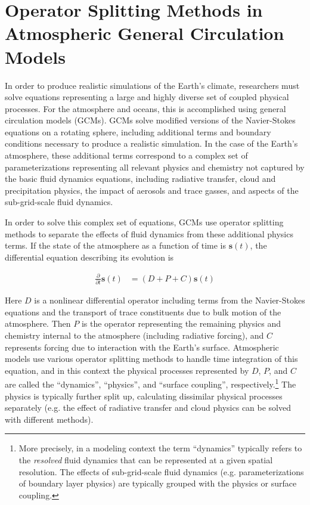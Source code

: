 \documentclass [11pt, proquest] {uwthesis}[2020/02/24]
\begin{document}
\section{Operator Splitting Methods in Atmospheric General Circulation Models} \label{sec:splitting}

In order to produce realistic simulations of the Earth's climate, researchers must solve equations representing a large and highly diverse set of coupled physical processes. For the atmosphere and oceans, this is accomplished using general circulation models (GCMs). GCMs solve modified versions of the Navier-Stokes equations on a rotating sphere, including additional terms and boundary conditions necessary to produce a realistic simulation. In the case of the Earth's atmosphere, these additional terms correspond to a complex set of parameterizations representing all relevant physics and chemistry not captured by the basic fluid dynamics equations, including radiative transfer, cloud and precipitation physics, the impact of aerosols and trace gasses, and aspects of the sub-grid-scale fluid dynamics.

In order to solve this complex set of equations, GCMs use operator splitting methods to separate the effects of fluid dynamics from these additional physics terms. If the state of the atmosphere as a function of time is $\mathbf{s}(t)$, the differential equation describing its evolution is

\begin{align}
    \frac{\partial}{\partial t} \mathbf{s}(t) &= (D + P + C) \mathbf{s}(t)
\end{align}

Here $D$ is a nonlinear differential operator including terms from the Navier-Stokes equations and the transport of trace constituents due to bulk motion of the atmosphere. Then $P$ is the operator representing the remaining physics and chemistry internal to the atmosphere (including radiative forcing), and $C$ represents forcing due to interaction with the Earth's surface. Atmospheric models use various operator splitting methods to handle time integration of this equation, and in this context the physical processes represented by $D$, $P$, and $C$ are called the ``dynamics'', ``physics'', and ``surface coupling'', respectively.\footnote{More precisely, in a modeling context the term ``dynamics'' typically refers to the \emph{resolved} fluid dynamics that can be represented at a given spatial resolution. The effects of sub-grid-scale fluid dynamics (e.g. parameterizations of boundary layer physics) are typically grouped with the physics or surface coupling.} The physics is typically further split up, calculating dissimilar physical processes separately (e.g. the effect of radiative transfer and cloud physics can be solved with different methods).
\end{document}
